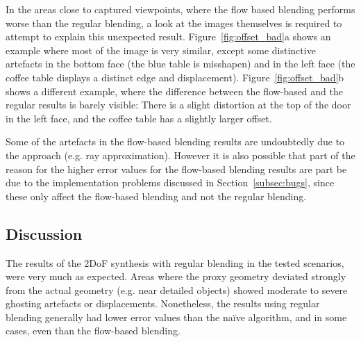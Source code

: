 In the areas close to captured viewpoints, where the flow based blending performs worse than the regular blending, a look at the images themselves is required to attempt to explain this unexpected result. Figure~\ref{fig:offset_bad}a shows an example where most of the image is very similar, except some distinctive artefacts in the bottom face (the blue table is misshapen) and in the left face (the coffee table displays a distinct edge and displacement). Figure~\ref{fig:offset_bad}b shows a different example, where the difference between the flow-based and the regular results is barely visible: There is a slight distortion at the top of the door in the left face, and the coffee table has a slightly larger offset.

Some of the artefacts in the flow-based blending results are undoubtedly due to the approach (e.g. ray approximation). However it is also possible that part of the reason for the higher error values for the flow-based blending results are part be due to the implementation problems discussed in Section~\ref{subsec:bugs}, since these only affect the flow-based blending and not the regular blending.









\subsection{Discussion} \label{subsec:discussion_virtual}
The results of the 2DoF synthesis with regular blending in the tested scenarios, were very much as expected. Areas where the proxy geometry deviated strongly from the actual geometry (e.g. near detailed objects) showed moderate to severe ghosting artefacts or displacements. Nonetheless, the results using regular blending generally had lower error values than the na\"ive algorithm, and in some cases, even than the flow-based blending.

